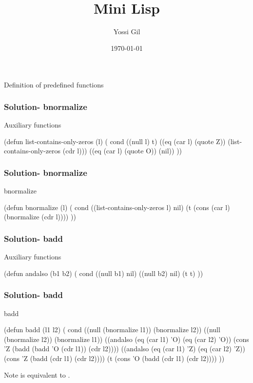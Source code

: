 \documentclass[fleqn]{beamer}
\title{Mini Lisp}
\author{Yossi Gil}
\institute[236319/2020/2021]{%
Programming Languages 236319⏎
Autumn 2020/Winter 2021 ⏎
Department of Computer Science ⏎
The Technion
}
\date{\today}
\begin{document}
\setLTR
\begin{frame}
\titlepage
\end{frame}



\begin{frame}{Definition of predefined functions}
\begin{LTR}
  
\end{LTR}
\end{frame}

\begin{frame}[fragile]
\frametitle{Solution- bnormalize}
\begin{block}{Auxiliary functions}
  \begin{LISP}
(defun list-contains-only-zeros (l) (
  cond
    ((null l) t)
    ((eq (car l) (quote Z))
      (list-contains-only-zeros (cdr l)))
    ((eq (car l) (quote O)) (nil))
))
    \end{LISP}
\end{block}
\end{frame}

\begin{frame}[fragile]
\frametitle{Solution- bnormalize}
\begin{block}{bnormalize}
  \begin{LISP}
(defun bnormalize (l) (
  cond
    ((list-contains-only-zeros l) nil)
    (t (cons (car l) (bnormalize (cdr l))))
))
    \end{LISP}
\end{block}
\end{frame}

\begin{frame}[fragile]
\frametitle{Solution- badd}
\begin{block}{Auxiliary functions}
  \begin{LISP}
(defun andalso (b1 b2) (
  cond
    ((null b1) nil)
    ((null b2) nil)
    (t t)
))
    \end{LISP}
\end{block}
\end{frame}

\begin{frame}[fragile]
\frametitle{Solution- badd}
\begin{block}{badd}
  \begin{LISP}
(defun badd (l1 l2) (
  cond
    ((null (bnormalize l1)) (bnormalize l2))
    ((null (bnormalize l2)) (bnormalize l1))
    ((andalso (eq (car l1) 'O) (eq (car l2) 'O))
      (cons 'Z (badd (badd 'O (cdr l1)) (cdr l2))))
    ((andalso (eq (car l1) 'Z) (eq (car l2) 'Z))
      (cons 'Z (badd (cdr l1) (cdr l2))))
    (t (cons 'O (badd (cdr l1) (cdr l2))))
))
    \end{LISP}
\end{block}

\begin{block}{Note}
   is equivalent to .
\end{block}
\end{frame}
\end{document}
